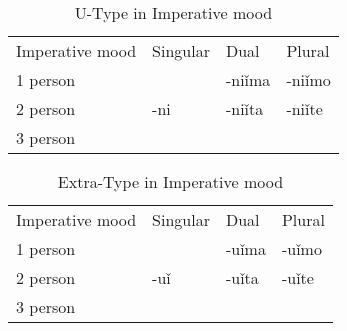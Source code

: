 \begin{table}[!htpb]
	\caption{U-Type in Imperative mood}
	\begin{tabular}{llll}
		Imperative mood & Singular & Dual & Plural \\
		1 person &  & -niǐma & -niǐmo \\
		2 person & -ni & -niǐta & -niǐte \\
		3 person &  &  & 
	\end{tabular}
\end{table}


\begin{table}[!htpb]
	\caption{Extra-Type in Imperative mood}
	\begin{tabular}{llll}
		Imperative mood & Singular & Dual & Plural \\
		1 person &  & -uǐma & -uǐmo \\
		2 person & -uǐ & -uǐta & -uǐte \\
		3 person &  &  & 
	\end{tabular}
\end{table}